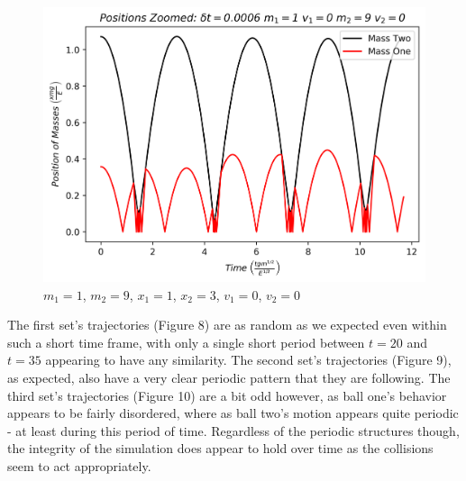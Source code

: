 \documentclass[twocolumn]{article}
\begin{document}
\begin{figure}[h]
\caption{$m_1=1$, $m_2=9$, $x_1=1$, $x_2=3$, $v_1=0$, $v_2=0$}
\centering
\includegraphics[scale=.45]{PositionsZoomed-MassOne1MassTwo9x1i1x2i3}
\end{figure}
\hspace{-3.8mm}The first set's trajectories (Figure 8) are as random as we expected even within such a short time frame, with only a single short period between $t=20$ and $t=35$  appearing to have any similarity. The second set's trajectories (Figure 9), as expected, also have a very clear periodic pattern that they are following. The third set's trajectories (Figure 10) are a bit odd however, as ball one's behavior appears to be fairly disordered, where as ball two's motion appears quite periodic - at least during this period of time. Regardless of the periodic structures though, the integrity of the simulation does appear to hold over time as the collisions seem to act appropriately.
\end{document}
